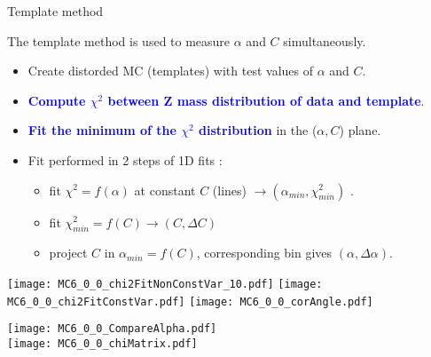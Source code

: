 \documentclass[a4paper]{beamer}
\begin{document}
\begin{frame}{Template method}
\begin{minipage}{0.59\linewidth}
  The template method is used to measure $\alpha$ and $C$ simultaneously.
\begin{itemize}
\item Create distorded MC (templates) with test values of $\alpha$ and $C$.
\item \textcolor{blue}{\bf Compute $\chi^2$ between Z mass distribution of data and template}.
\item \textcolor{blue}{\bf Fit the minimum of the $\chi^2$ distribution} in the ($\alpha,C$) plane.
\item Fit performed in 2 steps of 1D fits : 
\begin{itemize}
\item fit $\chi^2=f(\alpha)$ at constant $C$ (lines) $\rightarrow (\alpha_{min}, \chi^2_{min})$ .
\item fit $\chi^2_{min}=f(C)\rightarrow (C, \Delta C)$
\item project $C$ in $\alpha_{min}=f(C)$, corresponding bin gives $(\alpha, \Delta\alpha)$.
\end{itemize}
\end{itemize}
  \texttt{[image: MC6\_0\_0\_chi2FitNonConstVar\_10.pdf]}
  \texttt{[image: MC6\_0\_0\_chi2FitConstVar.pdf]}
  \texttt{[image: MC6\_0\_0\_corAngle.pdf]}
\end{minipage}
\hfill
\begin{minipage}{0.4\linewidth}
  \texttt{[image: MC6\_0\_0\_CompareAlpha.pdf]}\\
  \texttt{[image: MC6\_0\_0\_chiMatrix.pdf]}\\
\end{minipage}
\end{frame}
\end{document}
